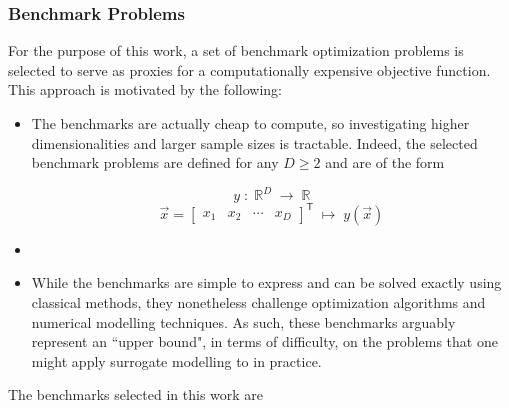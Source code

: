 \documentclass[conference]{IEEEtran}
\begin{document}
\subsubsection{Benchmark Problems}

For the purpose of this work, a set of benchmark optimization problems is selected to serve as proxies for a computationally expensive objective function. This approach is motivated by the following:

\begin{itemize}
	\item The benchmarks are actually cheap to compute, so investigating higher dimensionalities and larger sample sizes is tractable. Indeed, the selected benchmark problems are defined for any $D \geq 2$ and are of the form
	
	$$ y\;:\;\mathbb{R}^D\;\to\;\mathbb{R} $$
	$$ \vec{x} = \begin{bmatrix} x_1 & x_2 & \cdots & x_D \end{bmatrix}^\mathsf{T}\;\mapsto\;y(\vec{x})	 $$	
	
	\item []
	\item While the benchmarks are simple to express and can be solved exactly using classical methods, they nonetheless challenge optimization algorithms and numerical modelling techniques. As such, these benchmarks arguably represent an ``upper bound", in terms of difficulty, on the problems that one might apply surrogate modelling to in practice.
\end{itemize}

The benchmarks selected in this work are
\end{document}
